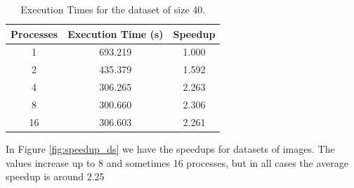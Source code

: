 \documentclass[10pt,twocolumn,letterpaper]{article}
\begin{document}
\begin{table}[H]
	\begin{center}
		\begin{tabular}{|c|c|c|}
			\hline
			Processes & Execution Time (s) & Speedup \\
			\hline
			1 & 693.219 & 1.000 \\
			2 & 435.379 & 1.592 \\
			4 & 306.265 & 2.263 \\
			8 & 300.660 & 2.306 \\
			16 & 306.603 & 2.261 \\
			\hline
		\end{tabular}
	\end{center}
	\caption{Execution Times for the dataset of size 40.}
	\label{tab:speedup_d_4}
\end{table}

In Figure \ref{fig:speedup_ds} we have the speedups for datasets of images. The values increase up to 8 and sometimes 16 processes, but in all cases the average speedup is around 2.25
\end{document}
